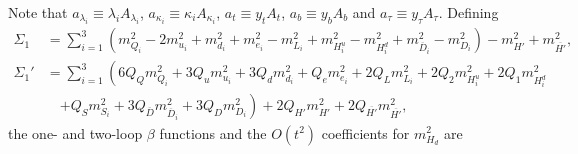 \documentclass[preprint,amsmath,amssymb,aps,superscriptaddress,prd,
showpacs,floatfix,nofootinbib]{revtex4-1}
\begin{document}
Note that $a_{\lambda_i} \equiv \lambda_i A_{\lambda_i}$, $a_{\kappa_i}
\equiv \kappa_i A_{\kappa_i}$, $a_t \equiv y_t A_t$, $a_b \equiv y_b A_b$ and
$a_\tau \equiv y_\tau A_\tau$.  Defining
\begin{align}
\Sigma_1 &= \sum_{i=1}^3 \left ( m_{Q_i}^2 - 2 m_{u_i}^2 + m_{d_i}^2 +
m_{e_i}^2 - m_{L_i}^2 + m_{H_i^u}^2 - m_{H_i^d}^2 + m_{\overline{D}_i}^2 -
m_{D_i}^2 \right ) - m_{H'}^2 + m_{\overline{H'}}^2 ,
\label{eq:USSMGaugeSigmaTerm1} \\
\Sigma_1' &= \sum_{i=1}^3 \left ( 6 Q_Q m_{Q_i}^2 + 3 Q_u m_{u_i}^2 +
3 Q_d m_{d_i}^2 + Q_e m_{e_i}^2 + 2 Q_L m_{L_i}^2 + 2 Q_2 m_{H_i^u}^2 +
2 Q_1 m_{H_i^d}^2 \right . \nonumber \\
& \quad {} \left . + Q_S m_{S_i}^2 + 3 Q_{\overline{D}} m_{\overline{D}_i}^2 +
3 Q_D m_{D_i}^2 \right ) + 2 Q_{H'} m_{H'}^2 +
2 Q_{\overline{H'}} m_{\overline{H'}}^2 , \label{eq:USSMGaugeSigmaTerm1Pr}
\end{align}
the one- and two-loop $\beta$ functions and the $O(t^2)$ coefficients for
$m_{H_d}^2$ are
\end{document}

